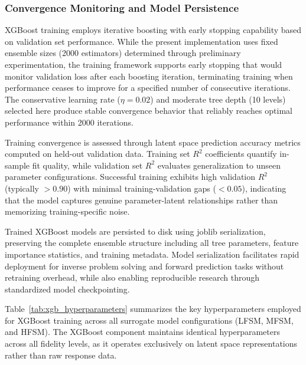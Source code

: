 \documentclass[12pt,a4paper]{report}
\begin{document}
\subsubsection{Convergence Monitoring and Model Persistence}

XGBoost training employs iterative boosting with early stopping capability based on validation set performance. While the present implementation uses fixed ensemble sizes (2000 estimators) determined through preliminary experimentation, the training framework supports early stopping that would monitor validation loss after each boosting iteration, terminating training when performance ceases to improve for a specified number of consecutive iterations. The conservative learning rate ($\eta = 0.02$) and moderate tree depth (10 levels) selected here produce stable convergence behavior that reliably reaches optimal performance within 2000 iterations.

Training convergence is assessed through latent space prediction accuracy metrics computed on held-out validation data. Training set $R^2$ coefficients quantify in-sample fit quality, while validation set $R^2$ evaluates generalization to unseen parameter configurations. Successful training exhibits high validation $R^2$ (typically $> 0.90$) with minimal training-validation gaps ($< 0.05$), indicating that the model captures genuine parameter-latent relationships rather than memorizing training-specific noise.

Trained XGBoost models are persisted to disk using joblib serialization, preserving the complete ensemble structure including all tree parameters, feature importance statistics, and training metadata. Model serialization facilitates rapid deployment for inverse problem solving and forward prediction tasks without retraining overhead, while also enabling reproducible research through standardized model checkpointing.

Table~\ref{tab:xgb_hyperparameters} summarizes the key hyperparameters employed for XGBoost training across all surrogate model configurations (LFSM, MFSM, and HFSM). The XGBoost component maintains identical hyperparameters across all fidelity levels, as it operates exclusively on latent space representations rather than raw response data.
\end{document}
